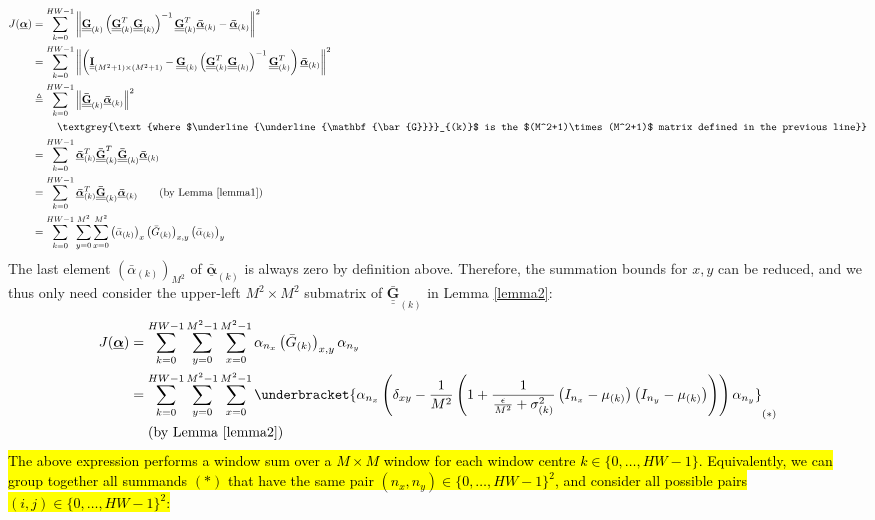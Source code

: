 \documentclass{article}
\def\vts#1{\underline{\boldsymbol{#1}}}
\def\mt#1{\underline{\underline{\mathbf{#1}}}}
\begin{document}
\begin{align*}
    J(\vts\alpha) &=  \sum_{k=0}^{HW-1} \left\| \mt G_{(k)}\left(\mt G_{(k)}^T \mt G_{(k)} \right)^{-1} \mt G_{(k)}^T \vts{\bar{\alpha}}_{(k)}  - \vts{\bar{\alpha}}_{(k)} \right\|^2\\
    &=  \sum_{k=0}^{HW-1} \left\| \left(\mt I_{(M^2+1)\times(M^2+1)} -  \mt G_{(k)}\left(\mt G_{(k)}^T \mt G_{(k)} \right)^{-1} \mt G_{(k)}^T \right) \vts{\bar{\alpha}}_{(k)}   \right\|^2\\
    &\triangleq  \sum_{k=0}^{HW-1} \left\| \mt{\bar{G}}_{(k)} \vts{\bar{\alpha}}_{(k)}   \right\|^2\\
    &\quad\quad\ \textgrey{\text{where $\mt{\bar{G}}_{(k)}$ is the $(M^2+1)\times(M^2+1)$ matrix defined in the previous line}}\\
    &= \sum_{k=0}^{HW-1} \vts{\bar{\alpha}}_{(k)}^T \mt{\bar{G}}_{(k)}^T \mt{\bar{G}}_{(k)} \vts{\bar{\alpha}}_{(k)}\\
    &= \sum_{k=0}^{HW-1} \vts{\bar{\alpha}}_{(k)}^T  \mt{\bar{G}}_{(k)} \vts{\bar{\alpha}}_{(k)} \qquad\text{(by Lemma \ref{lemma1})}\\
    &= \sum_{k=0}^{HW-1} \sum_{y=0}^{M^2} \sum_{x=0}^{M^2} \left({\bar{\alpha}}_{(k)}\right)_x  \left({\bar{G}}_{(k)}\right)_{x,y} \left({\bar{\alpha}}_{(k)}\right)_y
\end{align*}
The last element $\left({\bar{\alpha}}_{(k)}\right)_{M^2}$ of $\vts{\bar{\alpha}}_{(k)}$ is always zero by definition above. Therefore, the summation bounds for $x,y$ can be reduced, and we thus only need consider the upper-left $M^2\times M^2$ submatrix of ${\mt{\bar{G}}}_{(k)}$ in Lemma \ref{lemma2}:
\begin{align*}
    J(\vts\alpha) &= \sum_{k=0}^{HW-1} \sum_{y=0}^{M^2-1} \sum_{x=0}^{M^2-1} \alpha_{n_x}  \left({\bar{G}}_{(k)}\right)_{x,y} \alpha_{n_y}\\
    &= \sum_{k=0}^{HW-1} \sum_{y=0}^{M^2-1} \sum_{x=0}^{M^2-1} \underbracket{\alpha_{n_x}  \left( \delta_{xy} - \frac1{M^2}\left(1 + \frac1{\frac\epsilon{M^2} + \sigma_{(k)}^2} \left({I}_{n_x} - \mu_{(k)}\right) \left({I}_{n_y} - \mu_{(k)}\right) \right) \right) \alpha_{n_y}}_{(*)}\\
    &\quad\ \text{(by Lemma \ref{lemma2})}
\end{align*}
\hl{The above expression performs a window sum over a $M\times M$ window for each window centre $k\in\{0,\dots,HW-1\}$. Equivalently, we can group together all summands $(*)$ that have the same pair $(n_x,n_y)\in\{0,\dots,HW-1\}^2$, and consider all possible pairs $(i,j)\in\{0,\dots,HW-1\}^2$:}
\end{document}
